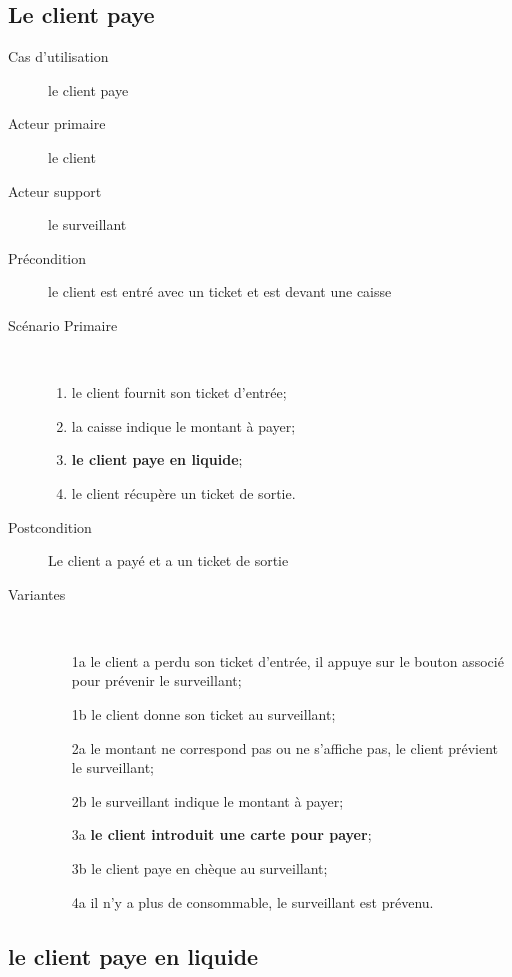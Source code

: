 \documentclass[a4paper]{article}
\begin{document}
\subsection{Le client paye}
\begin{description}
	\item[Cas d'utilisation] le client paye
	\item[Acteur primaire] le client
	\item[Acteur support] le surveillant
	\item[Pr\'econdition] le client est entr\'e avec un ticket et est devant une caisse
	\item[Sc\'enario Primaire] \
	\begin{enumerate}
		\item le client fournit son ticket d'entr\'ee;
		\item la caisse indique le montant \`a payer;
		\item \textbf{le client paye en liquide};
		\item le client r\'ecup\`ere un ticket de sortie.
	\end{enumerate}
	\item[Postcondition] Le client a pay\'e et a un ticket de sortie
	\item[Variantes] \
	\begin{enumerate}
		\item[1a] le client a perdu son ticket d'entr\'ee, il appuye sur le
			bouton associ\'e pour pr\'evenir le surveillant;
		\item[1b] le client donne son ticket au surveillant;
		\item[2a] le montant ne correspond pas ou ne s'affiche pas, le client
			pr\'evient le surveillant;
		\item[2b] le surveillant indique le montant \`a payer;
		\item[3a] \textbf{le client introduit une carte pour payer};
		\item[3b] le client paye en ch\`eque au surveillant;
		\item[4a] il n'y a plus de consommable, le surveillant est pr\'evenu.
	\end{enumerate}
\end{description}

\subsection{le client paye en liquide}
\end{document}
